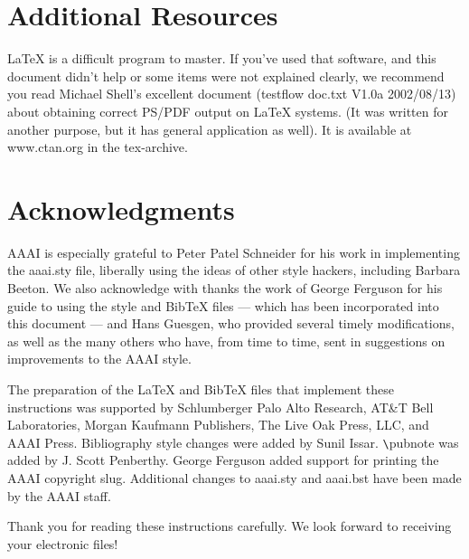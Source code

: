 \documentclass[letterpaper]{article}
\begin{document}
\section{Additional Resources}
\LaTeX{} is a difficult program to master. If you've used that software, and this document didn't help or some items were not explained clearly, we recommend you read Michael Shell's excellent document (testflow doc.txt V1.0a 2002/08/13) about obtaining correct PS/PDF output on \LaTeX{} systems. (It was written for another purpose, but it has general application as well). It is available at www.ctan.org in the tex-archive.

\section{ Acknowledgments}
AAAI is especially grateful to Peter Patel Schneider for his work in implementing the aaai.sty file, liberally using the ideas of other style hackers, including Barbara Beeton. We also acknowledge with thanks the work of George Ferguson for his guide to using the style and BibTeX files --- which has been incorporated into this document  --- and Hans Guesgen, who provided several timely modifications, as well as the many others who have, from time to time, sent in suggestions on improvements to the AAAI style. 

The preparation of the \LaTeX{} and Bib\TeX{} files that implement these instructions was supported by Schlumberger Palo Alto Research, AT\&T Bell Laboratories, Morgan Kaufmann Publishers, The Live Oak Press, LLC, and AAAI Press. Bibliography style changes were added by Sunil Issar. \verb+\+pubnote was added by J. Scott Penberthy. George Ferguson added support for printing the AAAI copyright slug. Additional changes to aaai.sty and aaai.bst have been made by the AAAI staff.

\bigskip
\noindent Thank you for reading these instructions carefully. We look forward to receiving your electronic files!
\end{document}

